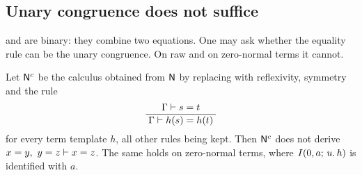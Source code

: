 \subsection{Unary congruence does not suffice}
\label{disch:sec:unary}

 and  are binary: they combine two
equations. One may ask whether the equality rule can be the unary
congruence. On raw and on zero-normal terms it cannot.

\begin{proposition}[An obstruction]
\label{disch:prop:unary}
Let $\mathsf{N}^{c}$ be the calculus obtained from $\mathsf{N}$ by replacing
 with reflexivity, symmetry and the rule
\[
 \dfrac{\;\Gamma\vdash s=t\;}{\;\Gamma\vdash h(s)=h(t)\;}
\]
for every term template $h$, all other rules being kept. Then $\mathsf{N}^{c}$
does not derive $x=y,\ y=z\vdash x=z$. The same holds on zero-normal
terms, where $I(0,a;\,u.\,h)$ is identified with $a$.
\end{proposition}

